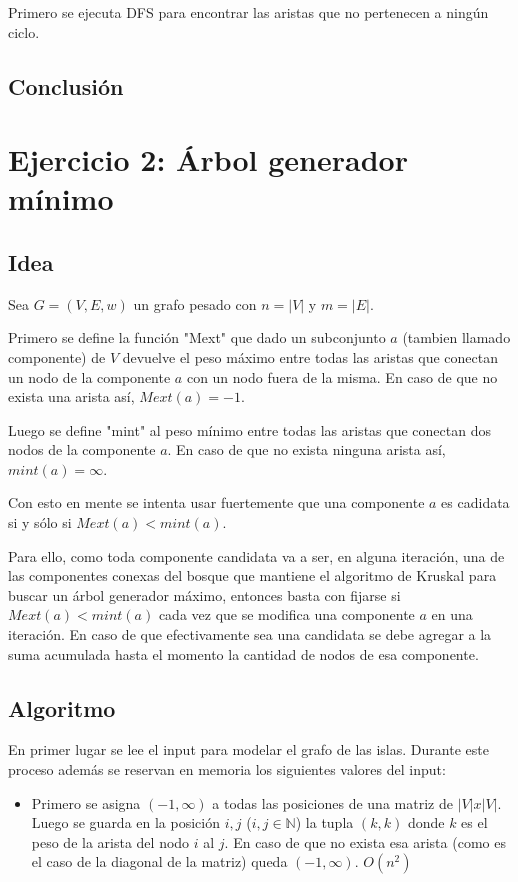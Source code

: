 \documentclass[a4paper]{article}
\begin{document}
Primero se ejecuta DFS para encontrar las aristas que no pertenecen a ningún ciclo.



\subsection{Conclusi\'on}

\newpage

\section{Ejercicio 2: Árbol generador mínimo} \label{ej2}



\subsection{Idea}
Sea $G=(V,E,w)$ un grafo pesado con $n = |V|$ y $m = |E|$.

Primero se define la función "Mext" que dado un subconjunto $a$ (tambien llamado componente) de $V$ devuelve el peso máximo entre todas las aristas que conectan un nodo de la componente $a$ con un nodo fuera de la misma. En caso de que no exista una arista así, $Mext(a)=-1$.

Luego se define "mint" al peso mínimo entre todas las aristas que conectan dos nodos de la componente $a$. En caso de que no exista ninguna arista así, $mint(a)=\infty$.

Con esto en mente se intenta usar fuertemente que una componente $a$ es cadidata si y sólo si  $Mext(a) < mint(a)$.

Para ello, como toda componente candidata va a ser, en alguna iteración, una de las componentes conexas del bosque que mantiene el algoritmo de Kruskal para buscar un árbol generador máximo, entonces basta con fijarse si  $Mext(a) < mint(a)$ cada vez que se modifica una componente $a$ en una iteración. En caso de que efectivamente sea una candidata se debe agregar a la suma acumulada hasta el momento la cantidad de nodos de esa componente.

\subsection{Algoritmo}
En primer lugar se lee el input para modelar el grafo de las islas.
Durante este proceso además se reservan en memoria los siguientes valores del
input:

\begin{itemize}
    \item Primero se asigna $(-1,\infty)$ a todas las posiciones de una matriz de $|V| x |V|$. Luego se guarda en la posición $i,j$ ($i,j \in \mathbb{N}$) la tupla $(k,k)$ donde $k$ es el peso de la arista del nodo $i$ al $j$. En caso de que no exista esa arista (como es el caso de la diagonal de la matriz) queda $(-1,\infty)$. $O(n^2)$ 
\end{itemize}
\end{document}
